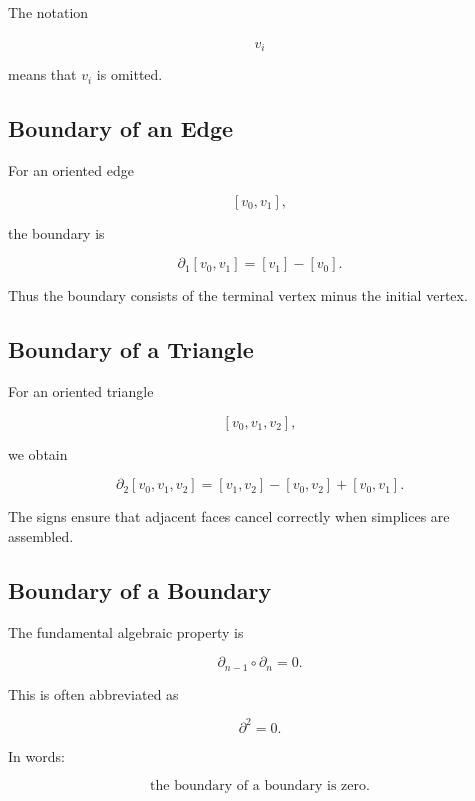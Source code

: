 The notation

\[
\widehat{v_i}
\]

means that \(v_i\) is omitted.

\subsection{Boundary of an Edge}
\label{subsec:boundary-edge}

For an oriented edge

\[
[v_0,v_1],
\]

the boundary is

\[
\boxed{
\partial_1[v_0,v_1]
=
[v_1]-[v_0].
}
\]

Thus the boundary consists of the terminal vertex minus the initial vertex.

\subsection{Boundary of a Triangle}
\label{subsec:boundary-triangle}

For an oriented triangle

\[
[v_0,v_1,v_2],
\]

we obtain

\[
\boxed{
\partial_2[v_0,v_1,v_2]
=
[v_1,v_2]
-
[v_0,v_2]
+
[v_0,v_1].
}
\]

The signs ensure that adjacent faces cancel correctly when simplices are
assembled.

\subsection{Boundary of a Boundary}
\label{subsec:boundary-squared-zero}

The fundamental algebraic property is

\[
\boxed{
\partial_{n-1}\circ\partial_n=0.
}
\]

This is often abbreviated as

\[
\boxed{
\partial^2=0.
}
\]

In words:

\[
\boxed{
\text{the boundary of a boundary is zero}.
}
\]

